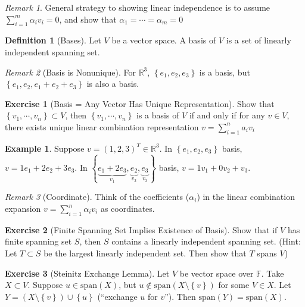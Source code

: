\documentclass[12pt, a4paper]{article}
\newcommand{\R}{\mathbb{R}}
\newcommand{\spantext}{\text{span}}
\theoremstyle{remark}
\newtheorem{remark}{Remark}
\theoremstyle{definition}
\newtheorem{definition}{Definition}
\newtheorem{example}{Example}
\newtheorem{exercise}{Exercise}
\numberwithin{equation}{section}
\numberwithin{definition}{section}
\numberwithin{example}{section}
\numberwithin{exercise}{section}
\numberwithin{remark}{section}
\numberwithin{figure}{section}
\begin{document}
\begin{remark}
    General strategy to showing linear independence is to assume $\sum_{i=1}^m \alpha_i v_i = 0$,
    and show that $\alpha_1 = \cdots = \alpha_{m} = 0$
\end{remark}
\begin{definition}[Bases]
    Let $V$ be a vector space. A basis of $V$ is a set of linearly independent spanning set.
\end{definition}
\begin{remark}[Basis is Nonunique]
    For $\R^3$, $\left\{ e_1, e_2, e_3 \right\}$ is a basis, but $\left\{ e_1, e_2, e_1 + e_2 + e_3 \right\}$ is also a basis.
\end{remark}
\begin{exercise}[Basis = Any Vector Has Unique Representation]
    Show that
    $\left\{ v_1, \cdots, v_n \right\} \subset V$, then
    $\left\{ v_1, \cdots, v_n \right\}$ is a basis of $V$ if and only if
    for any $v \in V$, there exists unique linear combination representation $v = \sum_{i=1}^n a_i v_i$
\end{exercise}
\begin{example}
    Suppose $v = \left( 1, 2, 3 \right)^T \in \R^3$.
    In $\left\{ e_1, e_2, e_3 \right\}$ basis, $v = 1e_1 + 2 e_2 + 3 e_3$.
    In $\left\{ \underbrace{e_1 + 2e_3}_{v_1}, \underbrace{e_2}_{v_2}, \underbrace{e_3}_{v_3} \right\}$ basis,
    $v = 1v_1 + 0v_2 + v_3$.
\end{example}
\begin{remark}[Coordinate]
    Think of the coefficients ($\alpha_i$) in the linear combination expansion $v = \sum_{i = 1}^n \alpha_i v_i$ as coordinates.
\end{remark}
\begin{exercise}[Finite Spanning Set Implies Existence of Basis]
    Show that if $V$ has finite spanning set $S$, then $S$ contains a linearly independent spanning set.
    (Hint: Let $T \subset S$ be the largest linearly independent set. Then show that $T$ spans $V$)
\end{exercise}
\begin{exercise}[Steinitz Exchange Lemma]
    Let $V$ be vector space over $\mathbb{F}$. Take $X \subset V$. Suppose $u \in \spantext \left( X \right)$,
    but $u \not\in \spantext \left( X \setminus \left\{ v \right\} \right)$ for some $V \in X$.
    Let $Y = \left( X \setminus \left\{ v \right\} \right) \cup \left\{ u \right\}$ 
    (``exchange $u$ for $v$''). Then $\spantext \left( Y \right) = \spantext \left( X \right)$.
\end{exercise}
\end{document}
